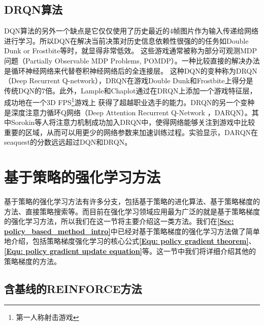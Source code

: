 \subsection{DRQN算法}
DQN算法的另外一个缺点是它仅仅使用了历史最近的4帧图片作为输入传递给网络进行学习。所以DQN在解决当前决策对历史信息依赖性很强的的任务如Double Dunk or Frostbite等时，就显得非常低效。 这些游戏通常被称为部分可观测MDP问题（Partially Observable MDP Problems, POMDP）。一种比较直接的解决办法是循环神经网络来代替卷积神经网络后的全连接层。 这种DQN的变种称为DRQN（Deep Recurrent Q-network），DRQN在游戏Double Dunk和Frostbite上得分是传统DQN的7倍。此外，Lample和Chaplot通过在DRQN上添加一个游戏特征层，成功地在一个3D FPS\footnote{第一人称射击游戏}游戏上
获得了超越职业选手的能力。DRQN的另一个变种是深度注意力循环Q网络（Deep Attention Recurrent Q-Network ，DARQN）。其中Sorokin等人将注意力机制成功加入DRQN中，使得网络能够关注到游戏中比较重要的区域，从而可以用更少的网络参数来加速训练过程。实验显示，DARQN在seaquest的分数远远超过DQN和DRQN。

\section{基于策略的强化学习方法}
\label{sec:policy_based_method}

基于策略的强化学习方法有许多分支，包括基于策略的进化算法、基于策略梯度的方法、直接策略搜索等。而目前在强化学习领域应用最为广泛的就是基于策略梯度的强化学习方法，所以我们在这一节将主要介绍这一类方法。我们在\textbf{\eqref{Sec: policy_based_method_intro}}中已经对基于策略梯度的强化学习方法做了简单地介绍，包括策略梯度强化学习的核心公式\textbf{\eqref{Equ: policy gradient theorem}}、\textbf{\eqref{Equ: policy gradient update equation}}等。这一节中我们将详细介绍其他的策略梯度的方法。

\subsection{含基线的REINFORCE方法}

